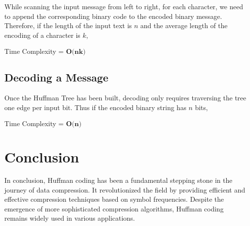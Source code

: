 \documentclass[18pt]{article}
\begin{document}
	While scanning the input message from left to right, for each character, we need to append the corresponding binary code to the encoded binary message. Therefore, if the length of the input text is $n$ and the average length of the encoding of a character is $k$, 
	
	Time Complexity = $\textbf{O(nk)}$
	
	\subsection{Decoding a Message}
	
	Once the Huffman Tree has been built, decoding only requires traversing the tree one edge per input bit. Thus if the encoded binary string has $n$ bits,
	
	Time Complexity = $\textbf{O(n)}$
	
	
	\newpage
	
	
	\section{Conclusion}
	
	In conclusion, Huffman coding has been a fundamental stepping
	stone in the journey of data compression. It revolutionized the field by providing efficient and effective
	compression techniques based on symbol frequencies. Despite the emergence of more sophisticated compression
	algorithms, Huffman coding remains widely used in various
	applications.
	
	
	\newpage
	
	
	
	
	
\end{document}
